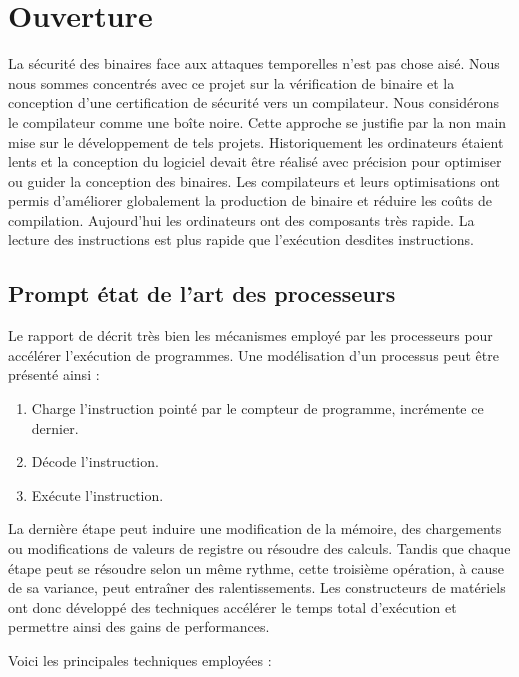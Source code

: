 \section*{Ouverture}

La sécurité des binaires face aux attaques temporelles n'est pas chose aisé. Nous nous sommes concentrés avec ce projet sur la vérification de binaire et la conception d'une certification de sécurité vers un compilateur. Nous considérons le compilateur comme une boîte noire. Cette approche se justifie par la non main mise sur le développement de tels projets. Historiquement les ordinateurs étaient lents et la conception du logiciel devait être réalisé avec précision pour optimiser ou guider la conception des binaires. Les compilateurs et leurs optimisations ont permis d'améliorer globalement la production de binaire et réduire les coûts de compilation. Aujourd'hui les ordinateurs ont des composants très rapide. La lecture des instructions est plus rapide que l'exécution desdites instructions.\smallbreak

\subsection*{Prompt état de l'art des processeurs}

Le rapport de \citeauthor{constantTimePornin} \cite{constantTimePornin} décrit très bien les mécanismes employé par les processeurs pour accélérer l'exécution de programmes. Une modélisation d'un processus peut être présenté ainsi :
\begin{enumerate}
    \item Charge l'instruction pointé par le compteur de programme, incrémente ce dernier.
    \item Décode l'instruction.
    \item Exécute l'instruction.
\end{enumerate}

La dernière étape peut induire une modification de la mémoire, des chargements ou modifications de valeurs de registre ou résoudre des calculs. Tandis que chaque étape peut se résoudre selon un même rythme, cette troisième opération, à cause de sa variance, peut entraîner des ralentissements. Les constructeurs de matériels ont donc développé des techniques accélérer le temps total d'exécution et permettre ainsi des gains de performances. \smallbreak

Voici les principales techniques employées :

